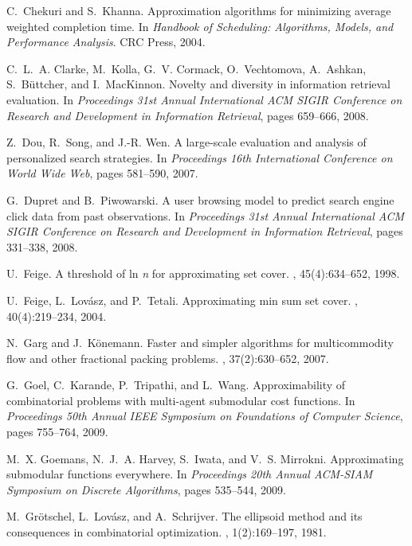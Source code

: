 \documentclass[11pt]{article}
\theoremstyle{plain}
\theoremstyle{definition}
\begin{document}
\begin{thebibliography}{10}
C.~Chekuri and S.~Khanna.
\newblock Approximation algorithms for minimizing average weighted completion
  time.
\newblock In {\em Handbook of Scheduling: Algorithms, Models, and Performance
  Analysis}. CRC Press, 2004.

C.~L.~A. Clarke, M.~Kolla, G.~V. Cormack, O.~Vechtomova,
A.~Ashkan,
  S.~B{\"u}ttcher, and I.~MacKinnon.
\newblock Novelty and diversity in information retrieval evaluation.
\newblock In {\em Proceedings 31st Annual International ACM SIGIR Conference on
  Research and Development in Information Retrieval}, pages 659--666, 2008.

Z.~Dou, R.~Song, and J.-R. Wen.
\newblock A large-scale evaluation and analysis of personalized search
  strategies.
\newblock In {\em Proceedings 16th International Conference on World Wide Web},
  pages 581--590, 2007.

G.~Dupret and B.~Piwowarski.
\newblock A user browsing model to predict search engine click data from past
  observations.
\newblock In {\em Proceedings 31st Annual International ACM SIGIR Conference on
  Research and Development in Information Retrieval}, pages 331--338, 2008.

U.~Feige.
\newblock A threshold of ln {\it n} for approximating set cover.
, 45(4):634--652, 1998.

U.~Feige, L.~Lov{\'a}sz, and P.~Tetali.
\newblock Approximating min sum set cover.
, 40(4):219--234, 2004.

N.~Garg and J.~K{\"o}nemann.
\newblock Faster and simpler algorithms for multicommodity flow and other
  fractional packing problems.
, 37(2):630--652, 2007.

G.~Goel, C.~Karande, P.~Tripathi, and L.~Wang.
\newblock Approximability of combinatorial problems with multi-agent submodular
  cost functions.
\newblock In {\em Proceedings 50th Annual IEEE Symposium on Foundations of
  Computer Science}, pages 755--764, 2009.

M.~X. Goemans, N.~J.~A. Harvey, S.~Iwata, and V.~S. Mirrokni.
\newblock Approximating submodular functions everywhere.
\newblock In {\em Proceedings 20th Annual ACM-SIAM Symposium on Discrete
  Algorithms}, pages 535--544, 2009.

M.~Gr{\"o}tschel, L.~Lov{\'a}sz, and A.~Schrijver.
\newblock The ellipsoid method and its consequences in combinatorial
  optimization.
, 1(2):169--197, 1981.


\end{thebibliography}
\end{document}
